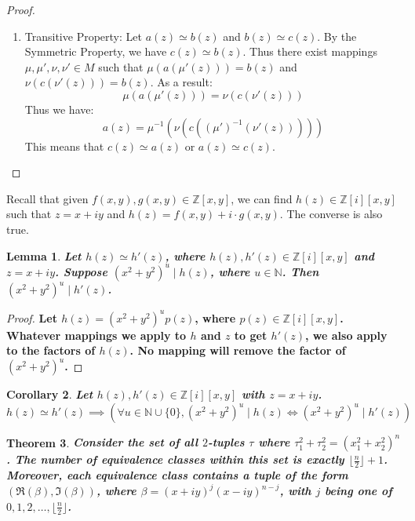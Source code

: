 \documentclass[12pt]{article}
\newtheorem{theorem}{Theorem}
\newtheorem{lemma}[theorem]{Lemma}
\newtheorem{corollary}[theorem]{Corollary}
\numberwithin{equation}{section}
\newcommand{\divides}{\mid}
\begin{document}
\begin{landscape}
{{\begin{proof}
\begin{enumerate}
\item Transitive Property: Let \( a(z) \simeq b(z) \) and \( b(z) \simeq c(z) \). By the 
Symmetric Property, we have \( c(z) \simeq b(z) \). Thus there exist mappings
\( \mu, \mu', \nu, \nu' \in M \) such that \( \mu( a( \mu'( z ) ) )  = b(z) \) and 
\( \nu( c( \nu'( z ) ) )  = b(z) \). As a result:
\[
\mu( a( \mu'( z ) ) ) = \nu( c( \nu'( z ) ) )  
\]
Thus we have: 
\[
a(  z  ) = \mu^{-1}( \nu( c( (\mu')^{-1}( \nu'( z ) ) ) ) )
\]
This means that \( c(z) \simeq a(z) \) or \( a(z) \simeq c(z) \).
\end{enumerate}
\end{proof}
Recall that given \( f(x,y), g(x,y) \in \mathbb{Z}[x,y] \),
we can find \( h(z) \in \mathbb{Z} [i][x,y] \)
such that
\( z = x + iy \)
and
\( h(z) = f(x,y) + i \cdot g(x,y) \). 
The converse is also true.



\begin{lemma}
\bf Let \( h(z) \simeq h'(z) \), where \( h(z), h'(z) \in \mathbb{Z}[i][x,y] \)
 and \( z = x+ iy \). Suppose \( ( x^2 + y^2 ) ^ u
    \divides h(z) \), where \( u \in \mathbb{N} \). Then \( ( x^2 + y^2 ) ^ u \divides h'(z) \).
\end{lemma}
   
\begin{proof}
\bf
Let \( h(z) = ( x^2 + y^2 ) ^ u  p(z) \), where \( p(z) \in \mathbb{Z} [i][x,y] \). 
Whatever mappings we apply to \(h\) and \(z\)
to get \( h'(z) \), we also apply to the factors of \( h(z) \). 
No mapping will remove the factor of \( ( x^2 + y^2 ) ^ u \).

\end{proof}

\begin{corollary}
\bf
Let \( h(z), h'(z) \in \mathbb{Z}[i][x,y] \) with \( z = x+ iy \).
\[
h(z) \simeq h'(z) 
\implies 
( \forall u \in \mathbb{N} \cup \{ 0 \},  ( x^2 + y^2 ) ^ u \divides h(z)  \iff ( x^2 + y^2 ) ^ u \divides h'(z)  )
\]
\end{corollary}




\begin{theorem}
\bf
Consider the set of all \(2\)-tuples \( \tau \) where 
\(
  \tau_1 ^ 2   +   \tau_2 ^ 2   
= 
\left(  x_1 ^ 2 + x_2 ^ 2  \right) ^ n 
\).
The number of equivalence classes within this set 
is exactly  \( \lfloor \frac{n}{2} \rfloor + 1 \). 
Moreover, each equivalence class contains a tuple
of the form \( ( \Re( \beta ) , \Im( \beta ) ) \),
where \( \beta = (x + iy)^j (x -  iy)^{n-j} \),
with \( j \)
being one of \( 0, 1, 2, \ldots, \lfloor \frac{n}{2} \rfloor \).
\end{theorem}



}}
\end{landscape}
\end{document}

